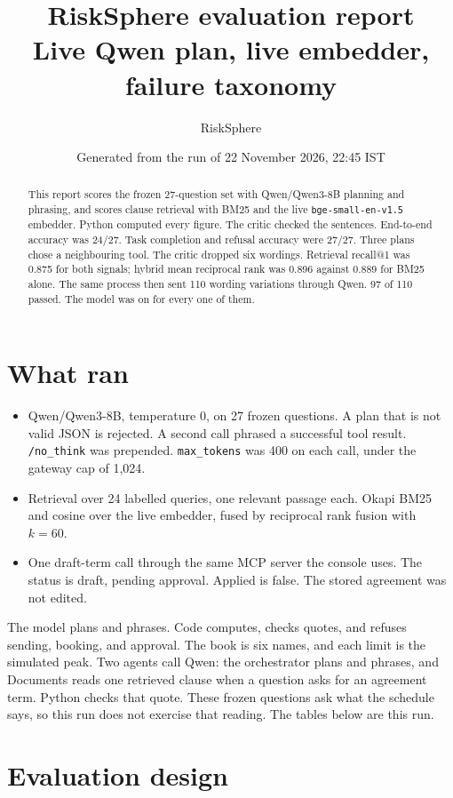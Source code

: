 \documentclass[11pt,a4paper]{article}
\title{RiskSphere evaluation report\\[0.4em]
\large Live Qwen plan, live embedder, failure taxonomy}
\author{RiskSphere}
\date{Generated from the run of 22 November 2026, 22:45 IST}
\begin{document}
\maketitle

\begin{abstract}
\noindent
This report scores the frozen 27-question set with Qwen/Qwen3-8B planning and phrasing, and scores clause retrieval with BM25 and the live \texttt{bge-small-en-v1.5} embedder. Python computed every figure. The critic checked the sentences. End-to-end accuracy was 24/27. Task completion and refusal accuracy were 27/27. Three plans chose a neighbouring tool. The critic dropped six wordings. Retrieval recall@1 was 0.875 for both signals; hybrid mean reciprocal rank was 0.896 against 0.889 for BM25 alone. The same process then sent 110 wording variations through Qwen. 97 of 110 passed. The model was on for every one of them.
\end{abstract}

\section{What ran}

\begin{itemize}
  \item Qwen/Qwen3-8B, temperature 0, on 27 frozen questions. A plan that is not valid JSON is rejected. A second call phrased a successful tool result. \texttt{/no\_think} was prepended. \texttt{max\_tokens} was 400 on each call, under the gateway cap of 1{,}024.
  \item Retrieval over 24 labelled queries, one relevant passage each. Okapi BM25 and cosine over the live embedder, fused by reciprocal rank fusion with $k=60$.
  \item One draft-term call through the same MCP server the console uses. The status is draft, pending approval. Applied is false. The stored agreement was not edited.
\end{itemize}

The model plans and phrases. Code computes, checks quotes, and refuses sending, booking, and approval. The book is six names, and each limit is the simulated peak. Two agents call Qwen: the orchestrator plans and phrases, and Documents reads one retrieved clause when a question asks for an agreement term. Python checks that quote. These frozen questions ask what the schedule says, so this run does not exercise that reading. The tables below are this run.

\section{Evaluation design}
\end{document}
